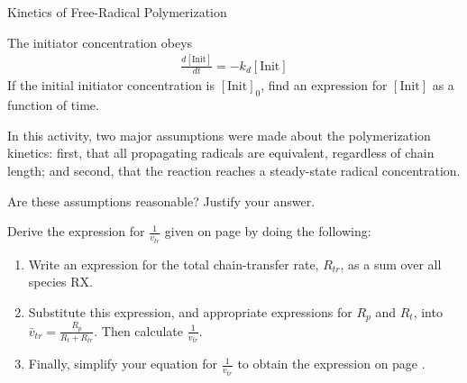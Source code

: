 \begin{activity}{Kinetics of Free-Radical Polymerization}
\begin{ctqs}
		\begin{solution}[2.5in]
		\end{solution}
	
\end{ctqs}


\begin{exercises}

	\exercise The initiator concentration obeys
		\begin{align*}
			\frac{d[\text{Init}]}{dt} = -k_d[\text{Init}]
		\end{align*}
		If the initial initiator concentration is $[\text{Init}]_0$, find an expression for $[\text{Init}]$ as a function of time.
		
	\exercise In this activity, two major assumptions were made about the polymerization kinetics: first, that all propagating radicals are equivalent, regardless of chain length; and second, that the reaction reaches a steady-state radical concentration.
	
		Are these assumptions reasonable?  Justify your answer.
		
	\exercise Derive the expression for $\frac{1}{v_{tr}}$ given on page \pageref{\labelbase:info:vtr} by doing the following:
	
		\label{\labelbase:exc:chainxfer}
		
		\begin{enumerate}
			\item Write an expression for the total chain-transfer rate, $R_{tr}$, as a sum over all species RX.
			\item Substitute this expression, and appropriate expressions for $R_p$ and $R_t$, into $\bar v_{tr} = \frac{R_p}{R_t + R_{tr}}$.  Then calculate $\frac{1}{v_{tr}}$.
			\item Finally, simplify your equation for $\frac{1}{v_{tr}}$ to obtain the expression on page \pageref{\labelbase:info:vtr}.
		\end{enumerate}
		

%
	

\end{exercises}
\end{activity}
